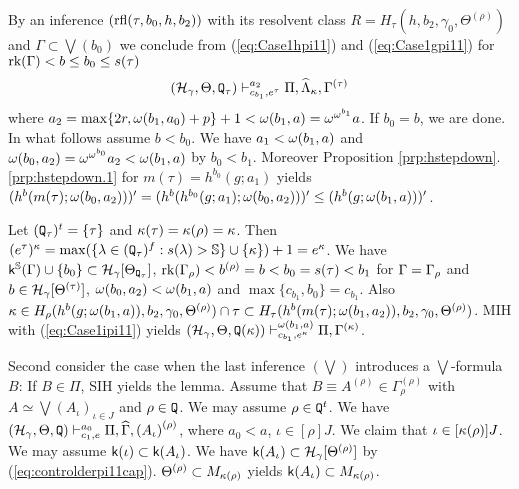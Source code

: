 \documentclass{article}
\newcommand{\mS}{\mathbb{S}}
\begin{document}
By an inference 
$({\rm rfl}(\tau,b_{0},h,b_{2}))$ 
with 
its resolvent class 
$R=H_{\tau}(h,b_{2},\gamma_{0},\Theta^{(\rho)})$ and $\Gamma\subset\bigvee(b_{0})$ 
we conclude
from (\ref{eq:Case1hpi11})
and (\ref{eq:Case1gpi11})
for $\mbox{{\rm rk}}(\Gamma)<b\leq b_{0}\leq s(\tau)$
\begin{equation}\label{eq:Case1ipi11}
(\mathcal{H}_{\gamma},\Theta,
{\tt Q}_{\tau}
)
\vdash^{a_{2}}_{c_{b_{1}},e^{\tau}}
\Pi,\widehat{\Lambda}_{\kappa},\Gamma^{(\tau)}
\end{equation}
where 
$a_{2}=\max\{2r,\omega(b_{1},a_{0})+p\}+1<\omega(b_{1},a)=\omega^{\omega^{b_{1}}} a$.
If $b_{0}=b$, we are done.
In what follows assume $b<b_{0}$.
We have $a_{1}<\omega(b_{1},a)$ and 
$\omega(b_{0},a_{2})=\omega^{\omega^{b_{0}}}a_{2}<\omega(b_{1},a)$ by 
$b_{0}<b_{1}$.
Moreover Proposition \ref{prp:hstepdown}.\ref{prp:hstepdown.1} 
for $m(\tau)=h^{b_{0}}(g;a_{1})$ yields
$(h^{b}(m(\tau);\omega(b_{0},a_{2})))^{\prime}=
(h^{b}(h^{b_{0}}(g;a_{1});\omega(b_{0},a_{2})))^{\prime}
\leq (h^{b}(g;\omega(b_{1},a)))^{\prime}$.

Let $({\tt Q}_{\tau})^{t}=\{\tau\}$ and $\kappa(\tau)=\kappa(\rho)=\kappa$. Then 
$(e^{\tau})^{\kap}=\max(\{\lam\in({\tt Q}_{\tau})^{f} : s(\lam)>\mS\}\cup\{\kap\})+1=e^{\kap}$.
We have $\sfk^{\mS}(\Gam)\cup\{b_{0}\}\subset\calh_{\gam}[\Tht_{{\tt Q}_{\tau}}]$, 
$\mbox{{\rm rk}}(\Gamma_{\rho})<b^{(\rho)}=b<b_{0}=s(\tau)<b_{1}$ for $\Gamma=\Gamma_{\rho}$ and
$b\in{\cal H}_{\gamma}[\Theta^{(\tau)}]$,
$\omega(b_{0},a_{2})<\omega(b_{1},a)$ and
$\max\{c_{b_{1}},b_{0}\}=c_{b_{1}}$.
Also
$\kappa\in H_{\rho}(h^{b}(g;\omega(b_{1},a)),b_{2}, \gamma_{0},\Theta^{(\rho)})\cap\tau
\subset
H_{\tau}(h^{b}(m(\tau);\omega(b_{1},a_{2})),b_{2}, \gamma_{0},\Theta^{(\rho)})$.
MIH with (\ref{eq:Case1ipi11}) yields
$
(\mathcal{H}_{\gamma},\Theta,
{\tt Q}(\kappa)
)
\vdash^{\omega(b_{1},a)}_{c_{b_{1}},e^{\kappa}}
\Pi,\Gamma^{(\kappa)}
$.

Second consider the case when the last inference $(\bigvee)$ introduces a $\bigvee$-formula
$B$:
If $B\in\Pi$, SIH yields the lemma.
Assume that
$B\equiv A^{(\rho)}\in\Gamma_{\rho}^{(\rho)}$
with $A\simeq\bigvee\left(A_{\iota}\right)_{\iota\in J}$ and $\rho\in {\tt Q}$.
We may assume $\rho\in{\tt Q}^{t}$.
We have 
$
(\mathcal{H}_{\gamma},\Theta,{\tt Q}
)
\vdash^{a_{0}}_{c_{1},e}
\Pi,\widehat{\Gamma},\left(A_{\iota}\right)^{(\rho)}
$,
where $a_{0}<a$, $\iota\in [\rho]J$.
We claim that
$\iota\in [\kappa(\rho)]J$.
We may assume ${\sf k}(\iota)\subset{\sf k}(A_{\iota})$.
We have ${\sf k}(A_{\iota})\subset{\cal H}_{\gamma}[\Theta^{(\rho)}]$ by (\ref{eq:controlderpi11cap}).
$\Theta^{(\rho)}\subset M_{\kappa(\rho)}$ yields 
${\sf k}(A_{\iota})\subset M_{\kappa(\rho)}$.
\end{document}
